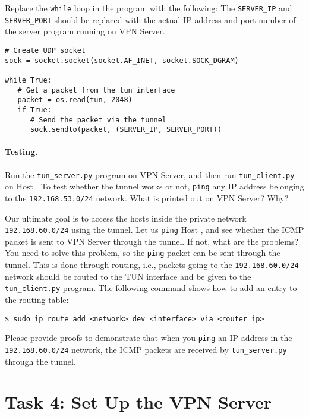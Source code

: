Replace the \texttt{while} loop in the program with the following: 
The \texttt{SERVER\_IP} and \texttt{SERVER\_PORT} should be   
replaced with the actual IP address and port number of the server program running
on VPN Server.

\begin{lstlisting}
# Create UDP socket
sock = socket.socket(socket.AF_INET, socket.SOCK_DGRAM)

while True:
   # Get a packet from the tun interface
   packet = os.read(tun, 2048)
   if True:
      # Send the packet via the tunnel
      sock.sendto(packet, (SERVER_IP, SERVER_PORT))
\end{lstlisting}




\paragraph{Testing.} 
Run the \texttt{tun\_server.py} program on VPN Server, and then
run \texttt{tun\_client.py} on Host \hostu. To test whether the 
tunnel works or not,  \texttt{ping} any IP address belonging to the \texttt{192.168.53.0/24} network.  
What is printed out on VPN Server? Why? 


Our ultimate goal is to access the hosts inside the 
private network \texttt{192.168.60.0/24} using the tunnel. Let us 
\texttt{ping} Host \hostv, and see whether the ICMP packet is
sent to VPN Server through the tunnel. If not, what are the problems?
You need to solve this problem, so the \texttt{ping} packet can
be sent through the tunnel. This is done through routing, i.e., packets going to
the \texttt{192.168.60.0/24} network should be routed to the TUN interface and 
be given to the \texttt{tun\_client.py} program.  
The following command shows how to add an entry to the routing table:


\begin{lstlisting}
$ sudo ip route add <network> dev <interface> via <router ip>
\end{lstlisting}
 

Please provide proofs to demonstrate that when you \texttt{ping}
an IP address in the \texttt{192.168.60.0/24} network, the ICMP packets 
are received by \texttt{tun\_server.py} through the tunnel. 
 



\section{Task 4: Set Up the VPN Server}


